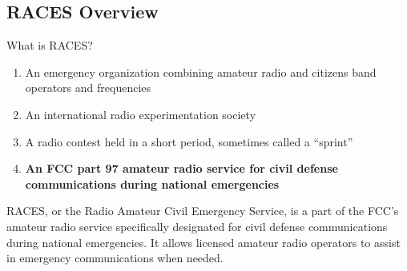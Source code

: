 \subsection{RACES Overview}
\label{T2C04}

\begin{tcolorbox}[colback=gray!10!white,colframe=black!75!black,title=T2C04]
What is RACES?
\begin{enumerate}[noitemsep]
    \item An emergency organization combining amateur radio and citizens band operators and frequencies
    \item An international radio experimentation society
    \item A radio contest held in a short period, sometimes called a “sprint”
    \item \textbf{An FCC part 97 amateur radio service for civil defense communications during national emergencies}
\end{enumerate}
\end{tcolorbox}

RACES, or the Radio Amateur Civil Emergency Service, is a part of the FCC's amateur radio service specifically designated for civil defense communications during national emergencies. It allows licensed amateur radio operators to assist in emergency communications when needed.